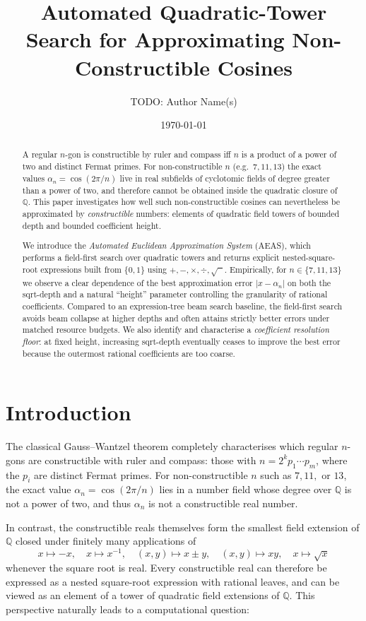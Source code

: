 \documentclass[11pt]{article}
\title{Automated Quadratic-Tower Search for Approximating Non-Constructible Cosines}
\author{TODO: Author Name(s)}
\date{\today}
\begin{document}
\maketitle

\begin{abstract}
A regular $n$-gon is constructible by ruler and compass iff $n$ is a product of a power of two and distinct Fermat primes.
For non-constructible $n$ (e.g.\ $7, 11, 13$) the exact values $\alpha_n = \cos(2\pi/n)$ live in real subfields of cyclotomic fields of degree greater than a power of two, and therefore cannot be obtained inside the quadratic closure of $\mathbb{Q}$.
This paper investigates how well such non-constructible cosines can nevertheless be approximated by \emph{constructible} numbers: elements of quadratic field towers of bounded depth and bounded coefficient height.

We introduce the \emph{Automated Euclidean Approximation System} (AEAS), which performs a field-first search over quadratic towers and returns explicit nested-square-root expressions built from $\{0,1\}$ using $+,-,\times,\div,\sqrt{\phantom{x}}$.
Empirically, for $n \in \{7,11,13\}$ we observe a clear dependence of the best approximation error $|x - \alpha_n|$ on both the sqrt-depth and a natural ``height'' parameter controlling the granularity of rational coefficients.
Compared to an expression-tree beam search baseline, the field-first search avoids beam collapse at higher depths and often attains strictly better errors under matched resource budgets.
We also identify and characterise a \emph{coefficient resolution floor}: at fixed height, increasing sqrt-depth eventually ceases to improve the best error because the outermost rational coefficients are too coarse.
\end{abstract}

\section{Introduction}

The classical Gauss--Wantzel theorem completely characterises which regular $n$-gons are constructible with ruler and compass: those with $n = 2^k p_1 \cdots p_m$, where the $p_i$ are distinct Fermat primes.
For non-constructible $n$ such as $7, 11,$ or $13$, the exact value $\alpha_n = \cos(2\pi/n)$ lies in a number field whose degree over $\mathbb{Q}$ is not a power of two, and thus $\alpha_n$ is not a constructible real number.

In contrast, the constructible reals themselves form the smallest field extension of $\mathbb{Q}$ closed under finitely many applications of
\[
  x \mapsto -x, \quad x \mapsto x^{-1}, \quad (x,y) \mapsto x \pm y, \quad (x,y) \mapsto xy, \quad x \mapsto \sqrt{x}
\]
whenever the square root is real.
Every constructible real can therefore be expressed as a nested square-root expression with rational leaves, and can be viewed as an element of a tower of quadratic field extensions of $\mathbb{Q}$.
This perspective naturally leads to a computational question:
\end{document}
